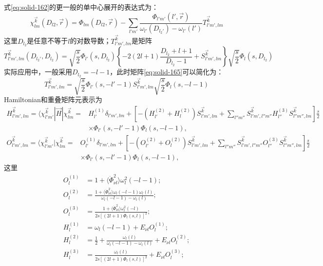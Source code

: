 式\eqref{eq:solid-162}的更一般的单中心展开的表达式为：
\begin{equation}
  \chi_{lm}^{\vec k}(D_{l2},\vec r)=\Phi_{lm}(D_{l2},\vec r)-\sum_{l'm'}\frac{\Phi_{l'm'}(l',\vec r)}{\omega_{l'}(D_{l_2'})-\omega_{l'}(l')}T_{l'm',lm}^{\vec k}
  \label{eq:solid-164}
\end{equation}
这里$D_{l_2}$是任意不等于$l$的对数导数；$T_{l'm',lm}^{\vec k}$是矩阵
\begin{equation}
  T_{l'm',lm}^{\vec k}(D_{l_2'},D_{l_2})=\sqrt{\frac s2}\Phi_{l'}(s,D_{l_2})\left\{-2(2l+1)\frac{D_{l_2}+l+1}{D_{l_2}-1}+S_{l'm',lm}^{\vec k}\right\}\sqrt{\frac s2}\Phi_l(s,D_{l_2})
  \label{eq:solid-165}
\end{equation}
实际应用中，一般采用$D_{l_2}=-l-1$，此时矩阵\eqref{eq:solid-165}可以简化为：
\begin{equation}
  T_{l'm',lm}^{\vec k}=\sqrt{\frac s2}\Phi_{l'}(s,-l'-1)S_{l'm',lm}^{\vec k}\sqrt{\frac s2}\Phi_l(s,-l-1)
  \label{eq:solid-166}
\end{equation}
Hamiltonian和重叠矩阵元表示为
\begin{equation}
  \begin{split}
    H_{l'm',lm}^{\vec k}=\langle\chi_{l'm'}^{\vec k}|\vec H|\chi_{lm}^{\vec k}=&H_{l'}^{(1)}\delta_{l'm',lm}+\left[-(H_{l'}^{(2)}+H_l^{(2)})S_{l'm',lm}^{\vec k}+\sum_{l''m''}S_{l'm',l''m''}^{\vec k}H_{l''}^{(3)}S_{l''m'',lm}^{\vec k}\right]\frac s2\\
    &\times\Phi_{l'}(s,-l'-1)\Phi_l(s,-l-1),
  \end{split}
  \label{eq:solid-167}
\end{equation}
\begin{equation}
  \begin{split}
    O_{l'm',lm}^{\vec k}=\langle\chi_{l'm'}^{\vec k}|\chi_{lm}^{\vec k}=&O_{l'}^{(1)}\delta_{l'm',lm}+\left[-(O_{l'}^{(2)}+O_l^{(2)})S_{l'm',lm}^{\vec k}+\sum_{l''m''}S_{l'm',l''m''}^{\vec k}O_{l''}^{(3)}S_{l''m'',lm}^{\vec k}\right]\frac s2\\
    &\times\Phi_{l'}(s,-l'-1)\Phi_l(s,-l-1),
  \end{split}
  \label{eq:solid-168}
\end{equation}
这里
\begin{equation}
  \begin{split}
    O_l^{(1)}&=1+\langle\dot\Phi_{\nu l}^2\rangle\omega_l^2(-l-1);\\
    O_l^{(2)}&=\frac{1+\langle\dot\Phi_{\nu l}^2\rangle\omega_l(-l-1)\omega_l(l)}{\omega_l(-l-1)-\omega_l(l)};\\
    O_l^{(3)}&=\frac{1+\langle\dot\Phi_{\nu l}^2\rangle\omega_l^2(-l)}{2s[(2l+1)\Phi_l(s,l)]^2};\\
    H_l^{(1)}&=\omega_l(-l-1)+E_{\nu l}O_l^{(1)};\\
    H_l^{(2)}&=\frac12+\frac{\omega_l(l)}{\omega_l(-l-1)-\omega_l(l)}+E_{\nu l}O_l^{(2)};\\
    H_l^{(3)}&=\frac{\omega_l(l)}{2s[(2l+1)\Phi_l(s,l)]^2}+E_{\nu l}O_l^{(3)};
  \end{split}
  \label{eq:solid-169}
\end{equation}
